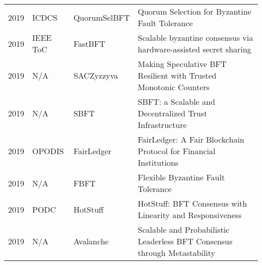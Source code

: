 \documentclass{article}
\begin{document}
\begin{landscape}
\begin{longtable}[c]{llll}
2019 & ICDCS             & QuorumSelBFT   & Quorum Selection for Byzantine Fault Tolerance    \cite{quorum20198884792}                                         \\
2019 & IEEE ToC          & FastBFT        & Scalable byzantine consensus via hardware-assisted secret sharing      \cite{8419336}                   \\
2019 & N/A               & SACZyzzyva     & Making Speculative BFT Resilient with Trusted Monotonic Counters \cite{DBLP:journals/corr/abs-1905-10255}                         \\
2019 & N/A               & SBFT           & SBFT: a Scalable and Decentralized Trust Infrastructure      \cite{DBLP:journals/corr/abs-1905-10255}                              \\
2019 &    OPODIS             & FairLedger           &  FairLedger: A Fair Blockchain Protocol for Financial Institutions   \cite{DBLP:journals/corr/abs-1906-03819}                               \\
2019 & N/A               & FBFT           & Flexible Byzantine Fault Tolerance     \cite{malkhi2019flexible}                                                    \\
2019 & PODC              & HotStuff       & HotStuff: BFT Consensus with Linearity and Responsiveness    \cite{Yin2019HotStuffBC}                               \\
2019 &  N/A            & Avalanche      &   Scalable and Probabilistic Leaderless BFT Consensus through Metastability   \cite{snowDBLP:journals/corr/abs-1906-08936}                    \\\hline
\end{longtable}
\end{landscape}
\end{document}
